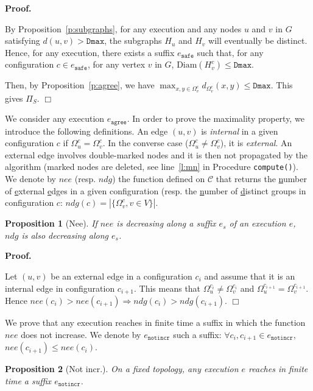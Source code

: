 \documentclass[11pt,english]{article}
\newtheorem{proposition}{Proposition}
\newenvironment{proof}[1][0cm]{
  \begin{list}{\bf Proof.~}{
      \setlength{\itemindent}{0cm}
      \setlength{\labelsep}{0cm}
      \setlength{\labelwidth}{#1}
      \setlength{\leftmargin}{#1}
    \item
    }
}{\hfill$\Box$
  \end{list}
}
\begin{document}
\begin{proof}
  By Proposition~\ref{p:subgraphs}, for any execution and any nodes $u$ and $v$
  in $G$ satisfying $d(u,v) > \texttt{Dmax}$, the subgraphs $H_u$ and $H_v$ will
  eventually be distinct. Hence, for any execution, there exists a suffix
  $e_\texttt{safe}$ such that, for any configuration $c \in e_\texttt{safe}$,
  for any vertex $v$ in $G$, $\text{Diam}(H_v^c) \leq \texttt{Dmax}$.

  Then, by Proposition~\ref{p:agree}, we have $\max_{x,y \in \Omega_v^c}
  d_{\Omega_v^c}(x,y) \leq \texttt{Dmax}$. This gives $\Pi_S$.
\end{proof}




We consider any execution $e_\texttt{agree}$.  In order to prove the maximality
property, we introduce the following definitions.  An edge $(u,v)$ is
\emph{internal} in a given configuration $c$ if $\Omega_u^c = \Omega_v^c$.  In
the converse case ($\Omega_u^c \neq \Omega_v^c$), it is \emph{external}.
An external edge involves double-marked nodes and it is then not propagated by
the algorithm (marked nodes are deleted, see line~\ref{l:mn} in Procedure
\texttt{compute()}).
We denote by $nee$ (resp. $ndg$) the function defined on $\mathcal{C}$ that
returns the \underline{n}umber of \underline{e}xternal \underline{e}dges in a
given configuration (resp. the \underline{n}umber of \underline{d}istinct
\underline{g}roups in configuration $c$: $ndg(c) = |\{ \Omega_v^c, v \in V\}|$.


\begin{proposition}[Nee]\label{p:nee}
  If $nee$ is decreasing along a suffix $e_s$ of an execution $e$, $ndg$ is also
  decreasing along $e_s$.
\end{proposition}

\begin{proof}
  Let $(u,v)$ be an external edge in a configuration $c_i$ and assume that it is
  an internal edge in configuration $c_{i+1}$. This means that $\Omega_u^{c_i}
  \neq \Omega_v^{c_i}$ and $\Omega_u^{c_{i+1}} = \Omega_v^{c_{i+1}}$. Hence
  $nee(c_i) > nee(c_{i+1}) \Rightarrow ndg(c_i) > ndg(c_{i+1})$.
\end{proof}

We prove that any execution reaches in finite time a suffix in which the
function $nee$ does not increase. We denote by $e_\texttt{notincr}$ such a
suffix: $\forall c_i, c_{i+1} \in e_\texttt{notincr}$, $nee(c_{i+1}) \leq
nee(c_i)$.

\begin{proposition}[Not incr.]\label{p:notincr}
  On a fixed topology, any execution $e$ reaches in finite time a suffix
  \emph{$e_\texttt{notincr}$}.
\end{proposition}
\end{document}
